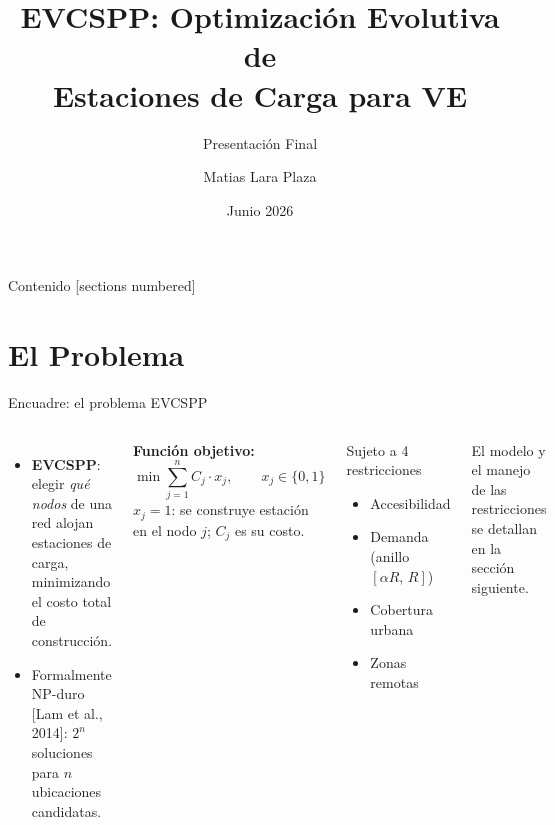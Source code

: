 \documentclass[aspectratio=169, 12pt]{beamer}
\title{EVCSPP: Optimización Evolutiva de\\Estaciones de Carga para VE}
\subtitle{Presentación Final}
\author{Matias Lara Plaza}
\institute{Inteligencia Artificial $\cdot$ 2026-1}
\date{Junio 2026}
\newcommand{\acento}[1]{\textcolor{Verde}{\textbf{#1}}}
\newcommand{\gris}[1]{\textcolor{GrisAzul}{#1}}
\begin{document}
\maketitle

\begin{frame}{Contenido}
  [sections numbered]
  \tableofcontents
\end{frame}

\section{El Problema}

\begin{frame}{Encuadre: el problema EVCSPP}
  \begin{columns}[T]
    \begin{itemize}
      \item \textbf{EVCSPP}: elegir \emph{qué nodos} de una red alojan estaciones de carga, minimizando el costo total de construcción.
      \item Formalmente \alert{NP-duro} \gris{[Lam et al., 2014]}: $2^n$ soluciones para $n$ ubicaciones candidatas.
    \end{itemize}
    \vspace{0.4em}
    \textbf{Función objetivo:}
    \[ \min \sum_{j=1}^{n} C_j \cdot x_j, \qquad x_j \in \{0,1\} \]
    \gris{\footnotesize $x_j = 1$: se construye estación en el nodo $j$; $C_j$ es su costo.}

    \begin{block}{Sujeto a 4 restricciones}
      \begin{itemize}\footnotesize
        \item[\acento{R1}] Accesibilidad
        \item[\acento{R2}] Demanda (anillo $[\alpha R,\,R]$)
        \item[\acento{R3}] Cobertura urbana
        \item[\acento{R4}] Zonas remotas
      \end{itemize}
    \end{block}
    \vspace{0.3em}
    \gris{\scriptsize El modelo y el manejo de las restricciones se detallan en la sección siguiente.}
  \end{columns}
\end{frame}
\end{document}
